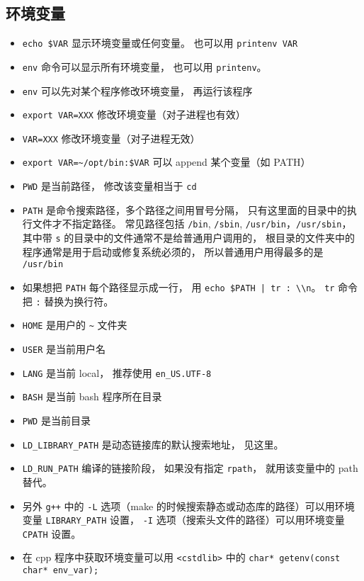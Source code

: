\subsection{环境变量}
\begin{itemize}
\item \verb|echo $VAR| 显示环境变量或任何变量。 也可以用 \verb|printenv VAR|
\item \verb|env| 命令可以显示所有环境变量， 也可以用 \verb|printenv|。
\item \verb|env| 可以先对某个程序修改环境变量， 再运行该程序
\item \verb|export VAR=XXX| 修改环境变量（对子进程也有效）
\item \verb|VAR=XXX| 修改环境变量（对子进程无效）
\item \verb|export VAR=~/opt/bin:$VAR| 可以 append 某个变量（如 PATH）
\item \verb|PWD| 是当前路径， 修改该变量相当于 \verb|cd|
\item \verb|PATH| 是命令搜索路径，多个路径之间用冒号分隔， 只有这里面的目录中的执行文件才不指定路径。 常见路径包括 \verb`/bin`, \verb`/sbin`, \verb`/usr/bin`，\verb`/usr/sbin`， 其中带 \verb`s` 的目录中的文件通常不是给普通用户调用的， 根目录的文件夹中的程序通常是用于启动或修复系统必须的， 所以普通用户用得最多的是 \verb`/usr/bin`
\item 如果想把 \verb|PATH| 每个路径显示成一行， 用 \verb`echo $PATH | tr : \\n`。 \verb|tr| 命令把 \verb|:| 替换为换行符。
\item \verb|HOME| 是用户的 \verb|~| 文件夹
\item \verb`USER` 是当前用户名
\item \verb`LANG` 是当前 local， 推荐使用 \verb`en_US.UTF-8`
\item \verb`BASH` 是当前 bash 程序所在目录
\item \verb|PWD| 是当前目录
\item \verb|LD_LIBRARY_PATH| 是动态链接库的默认搜索地址， 见这里。
\item \verb|LD_RUN_PATH| 编译的链接阶段， 如果没有指定 \verb|rpath|， 就用该变量中的 path 替代。
\item 另外 \verb|g++| 中的 \verb|-L| 选项（make 的时候搜索静态或动态库的路径）可以用环境变量 \verb|LIBRARY_PATH| 设置， \verb|-I| 选项（搜索头文件的路径）可以用环境变量 \verb|CPATH| 设置。
\item 在 cpp 程序中获取环境变量可以用 \verb`<cstdlib>` 中的 \verb`char* getenv(const char* env_var);`
\end{itemize}

